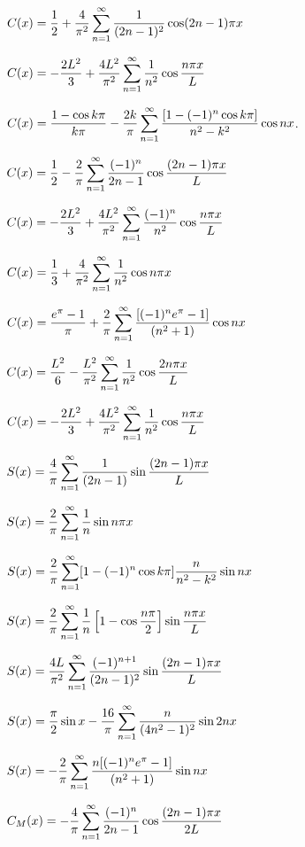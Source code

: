 $C(x)=\displaystyle\frac{1}{2}+\frac{4}{\pi^2}\sum_{n=1}^\infty\frac{1}{(2n-1)^2}
\cos(2n-1)\pi x$


$C(x)=\displaystyle-\frac{2L^2}{3}+\frac{4L^2}{\pi^2}\sum_{n=1}^\infty\frac{1}{n^2}\cos\frac{n\pi x}{L}$

$C(x)=\displaystyle\frac{1-\cos k\pi}{k\pi}-\frac{2k}{\pi}\sum_{n=1}^\infty
\frac{[1-(-1)^n\cos k\pi]}{n^2-k^2}\cos nx$.

 $C(x)=\displaystyle\frac{1}{2}-\frac{2}{\pi}\sum_{n=1}^\infty
\frac{(-1)^n}{2n-1}\cos\frac{(2n-1)\pi x}{L}$

$C(x)=\displaystyle-\frac{2L^2}{3}+\frac{4L^2}{\pi^2}\sum_{n=1}^\infty\frac{(-1)^n}{n^2}\cos\frac{n\pi x}{L}$


$C(x)=\displaystyle\frac{1}{3}+\frac{4}{\pi^2}\sum_{n=1}^\infty\frac{1}{n^2}\cos
n\pi x$


$C(x)=\displaystyle\frac{e^\pi-1}{\pi}+\frac{2}{\pi}\sum_{n=1}^\infty
\frac{[(-1)^ne^\pi-1]}{(n^2+1)}\cos nx$


$\displaystyle C(x)=\frac{L^2}{6}-\frac{L^2}{\pi^2}\sum_{n=1}^\infty\frac{1}{n^2}\cos\frac{2n\pi x}{L}$

$C(x)=\displaystyle-\frac{2L^2}{3}+\frac{4L^2}{\pi^2}\sum_{n=1}^\infty\frac{1}{n^2}\cos\frac{n\pi x}{L}$

$S(x)=\displaystyle\frac{4}{\pi}\sum_{n=1}^\infty\frac{1}{(2n-1)}
\sin\frac{(2n-1)\pi x}{L}$


$S(x)=\displaystyle\frac{2}{\pi}\sum_{n=1}^\infty\frac{1}{n}
\sin n\pi x$

$S(x)=\displaystyle\frac{2}{\pi}\sum_{n=1}^\infty
[1-(-1)^n\cos k\pi]\frac{n}{n^2-k^2}\sin nx$

$S(x)=\displaystyle\frac{2}{\pi}\sum_{n=1}^\infty\frac{1}{n}
\left[1-\cos\frac{n\pi}{2}\right]\sin\frac{n\pi x}{L}$




$S(x)=\displaystyle\frac{4L}{\pi^2}\sum_{n=1}^\infty\frac{(-1)^{n+1}}{(2n-1)^2}
\sin\frac{(2n-1)\pi x}{L}$


$S(x)=\displaystyle\frac{\pi}{2}\sin
x-\frac{16}{\pi}\sum_{n=1}^\infty\frac{n}{(4n^2-1)^2}\sin2nx$


$S(x)=\displaystyle-\frac{2}{\pi}\sum_{n=1}^\infty
\frac{n[(-1)^ne^\pi-1]}{(n^2+1)}\sin nx$

$C_M(x)=\displaystyle-\frac{4}{\pi}\sum_{n=1}^\infty\frac{(-1)^n}{2n-1}
\cos\frac{(2n-1)\pi x}{2L}$

